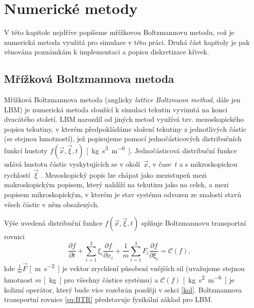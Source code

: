 \chapter{Numerické metody}
V této kapitole nejdříve popíšeme mřížkovou Boltzmannovu metodu, což je numerická metoda využitá pro simulace v této práci. Druhá část kapitoly je pak věnována poznámkám k implementaci a popisu diskretizace křivek.
\section{Mřížková Boltzmannova metoda}\label{LBM}
Mřížková Boltzmannova metoda (anglicky \textit{lattice Boltzmann method}, dále jen LBM) je numerická metoda sloužící k simulaci tekutin vyvinutá na konci dvacátého století. LBM narozdíl od jiných metod využívá tzv. mezoskopického popisu tekutiny, v kterém předpokládáme složení tekutiny z jednotlivých částic (se stejnou hmotností), jež popisujeme pomocí jednočásticových distribučních funkcí hustoty $ f(\vec{x},\vec{\xi}, t) $ \si{[kg.s^3.m^{-6}]}. Jednočásticová distribuční funkce udává hustotu částic vyskytujících se v okolí~$ \vec{x} $, v čase~$ t $ a s mikroskopickou rychlostí~$\vec{\xi}$ \cite{Kruger}. Mezoskopický popis lze chápat jako mezistupeň mezi makroskopickým popisem, který nahlíží na tekutinu jako na celek, a mezi popisem mikroskopickým, v kterém je stav systému odvozen ze znalosti stavů všech částic v něm obsažených.

Výše uvedená distribuční funkce $ f(\vec{x},\vec{\xi}, t) $ splňuje Boltzmannovu transportní rovnici
\begin{equation}\label{eq:BTR}
\frac{\partial f}{\partial t} + \sum_{i = 1}^{3} \xi _{i} \frac{\partial f}{\partial x_{i}} + \frac{1}{m} \sum_{i = 1}^{3} F_{i} \frac{\partial f}{\partial \xi _{i}} = \mathcal{C}(f), 
\end{equation}
kde $ \frac{1}{m} \vec{F} $ \si{[m.s^{-2}]} je vektor zrychlení působení vnějších sil (uvažujeme stejnou hmotnost $ m $ \si{[kg]} pro všechny částice systému) a $ \mathcal{C}(f)$ \si{[kg.s^2.m^{-6}]} je kolizní operátor, který bude více rozebrán později v sekci \ref{kol}. Boltzmannova transportní rovnice \eqref{eq:BTR} představuje fyzikální základ pro LBM. \cite{Kruger}

